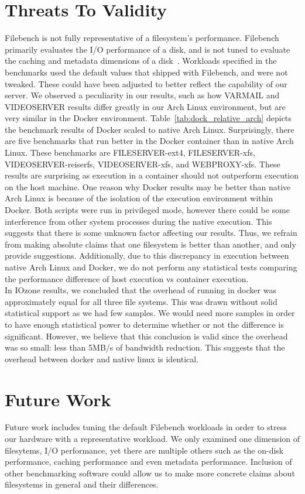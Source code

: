 \documentclass[letterpaper,twocolumn,10pt]{article}
\begin{document}
\section{Threats To Validity}
Filebench is not fully representative of a filesystem's performance. Filebench primarily evaluates the I/O performance of a disk, and is not tuned to evaluate the caching and metadata dimensions of a disk~\cite{tarasov2011benchmarking}. Workloads specified in the benchmarks used the default values that shipped with Filebench, and were not tweaked. These could have been adjusted to better reflect the capability of our server. 
We observed a peculiarity in our results, such as how VARMAIL and VIDEOSERVER results differ greatly in our Arch Linux environment, but are very similar in the Docker environment. Table~\ref{tab:dock_relative_arch} depicts the benchmark results of Docker scaled to native Arch Linux. Surprisingly, there are five benchmarks that run better in the Docker container than in native Arch Linux. These benchmarks are FILESERVER-ext4, FILESERVER-xfs, VIDEOSERVER-reiserfs, VIDEOSERVER-xfs, and WEBPROXY-xfs. These results are surprising as execution in a container should not outperform execution on the host machine. One reason why Docker results may be better than native Arch Linux is because of the isolation of the execution environment within Docker. Both scripts were run in privileged mode, however there could be some interference from other system processes during the native execution. This suggests that there is some unknown factor affecting our results. Thus, we refrain from making absolute claims that one filesystem is better than another, and only provide suggestions. Additionally, due to this discrepancy in execution between native Arch Linux and Docker, we do not perform any statistical tests comparing the performance difference of host execution vs container execution. \\

In IOzone results, we concluded that the overhead of running in docker was approximately equal for all three file systems. This was drawn without solid statistical support as we had few samples. We would need more samples in order to have enough statistical power to determine whether or not the difference is significant. However, we believe that this conclusion is valid since the overhead was so small: less than 5MB/s of bandwidth reduction. This suggests that the overhead between docker and native linux is identical.

\section{Future Work}
Future work includes tuning the default Filebench workloads in order to stress our hardware with a representative workload. We only examined one dimension of filesytems, I/O performance, yet there are multiple others such as the on-disk performance, caching performance and even metadata performance. Inclusion of other benchmarking software could allow us to make more concrete claims about filesystems in general and their differences.\\
\end{document}
